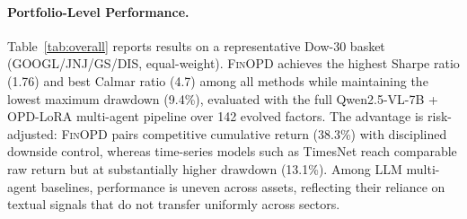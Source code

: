 \paragraph{Portfolio-Level Performance.} Table~\ref{tab:overall} reports results on a representative Dow-30 basket (GOOGL/JNJ/GS/DIS, equal-weight). \textsc{FinOPD} achieves the highest Sharpe ratio (1.76) and best Calmar ratio (4.7) among all methods while maintaining the lowest maximum drawdown (9.4\%), evaluated with the full Qwen2.5-VL-7B + OPD-LoRA multi-agent pipeline over 142 evolved factors. The advantage is risk-adjusted: \textsc{FinOPD} pairs competitive cumulative return (38.3\%) with disciplined downside control, whereas time-series models such as TimesNet reach comparable raw return but at substantially higher drawdown (13.1\%). Among LLM multi-agent baselines, performance is uneven across assets, reflecting their reliance on textual signals that do not transfer uniformly across sectors.




